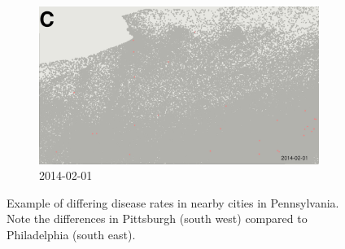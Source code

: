 \begin{figure}
\begin{subfigure}[b]{0.6\textwidth}
        \includegraphics[width=\textwidth]{longitude/figs/visual/pa2.png}
        \caption*{2014-02-01}
    \end{subfigure}
    \caption{Example of differing disease rates in nearby cities in Pennsylvania. Note the differences in Pittsburgh (south west) compared to Philadelphia (south east).}\label{fig:pennsylvania}
\end{figure}

